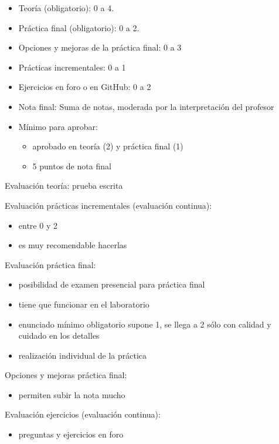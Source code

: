 \documentclass[a4paper,12pt]{article}
\begin{document}
\begin{itemize}
\item Teoría (obligatorio): 0 a 4.
\item Práctica final (obligatorio): 0 a 2.
\item Opciones y mejoras de la práctica final: 0 a 3
\item Prácticas incrementales: 0 a 1
\item Ejercicios en foro o en GitHub: 0 a 2
\item Nota final: Suma de notas, moderada por la interpretación del profesor
\item Mínimo para aprobar:
      \begin{itemize}
      \item aprobado en teoría (2) y práctica final (1)
      \item 5 puntos de nota final
      \end{itemize}
\end{itemize}

Evaluación teoría: prueba escrita

Evaluación prácticas incrementales (evaluación continua):

\begin{itemize}
\item entre 0 y 2
\item es muy recomendable hacerlas
\end{itemize}

Evaluación práctica final:

\begin{itemize}
\item posibilidad de examen presencial para práctica final
\item tiene que funcionar en el laboratorio
\item enunciado mínimo obligatorio supone 1, se llega a 2 sólo con calidad y cuidado en los detalles
\item realización individual de la práctica
\end{itemize}

Opciones y mejoras práctica final:

\begin{itemize}
\item permiten subir la nota mucho
\end{itemize}

Evaluación ejercicios (evaluación continua):

\begin{itemize}
\item preguntas y ejercicios en foro
\end{itemize}
\end{document}
